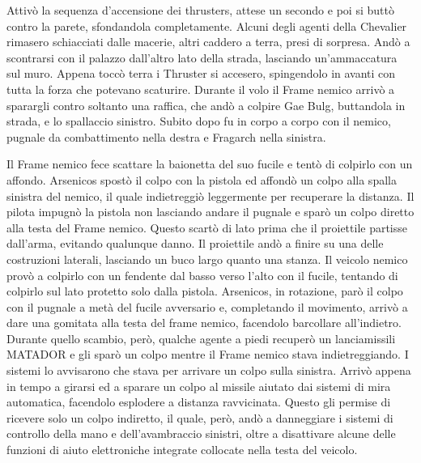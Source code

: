     Attivò la sequenza d'accensione dei thrusters, attese un secondo e poi si buttò contro la parete, sfondandola
    completamente. Alcuni degli agenti della Chevalier rimasero schiacciati dalle macerie, altri caddero a terra, presi
    di sorpresa. Andò a scontrarsi con il palazzo dall'altro lato della strada, lasciando un'ammaccatura sul muro.
    Appena toccò terra i Thruster si accesero, spingendolo in avanti con tutta la forza che potevano scaturire. Durante
    il volo il Frame nemico arrivò a sparargli contro soltanto una raffica, che andò a colpire Gae Bulg, buttandola in
    strada, e lo spallaccio sinistro. Subito dopo fu in corpo a corpo con il nemico, pugnale da combattimento nella
    destra e Fragarch nella sinistra.

    Il Frame nemico fece scattare la baionetta del suo fucile e tentò di colpirlo con un affondo. Arsenicos spostò il
    colpo con la pistola ed affondò un colpo alla spalla sinistra del nemico, il quale indietreggiò leggermente per
    recuperare la distanza. Il pilota impugnò la pistola non lasciando andare il pugnale e sparò un colpo diretto alla
    testa del Frame nemico. Questo scartò di lato prima che il proiettile partisse dall'arma, evitando qualunque danno.
    Il proiettile andò a finire su una delle costruzioni laterali, lasciando un buco largo quanto una stanza. Il veicolo
    nemico provò a colpirlo con un fendente dal basso verso l'alto con il fucile, tentando di colpirlo sul lato protetto
    solo dalla pistola. Arsenicos, in rotazione, parò il colpo con il pugnale a metà del fucile avversario e,
    completando il movimento, arrivò a dare una gomitata alla testa del frame nemico, facendolo barcollare all'indietro.
    Durante quello scambio, però, qualche agente a piedi recuperò un lanciamissili MATADOR e gli sparò un colpo mentre
    il Frame nemico stava indietreggiando. I sistemi lo avvisarono che stava per arrivare un colpo sulla sinistra.
    Arrivò appena in tempo a girarsi ed a sparare un colpo al missile aiutato dai sistemi di mira automatica, facendolo
    esplodere a distanza ravvicinata. Questo gli permise di ricevere solo un colpo indiretto, il quale, però, andò a
    danneggiare i sistemi di controllo della mano e dell'avambraccio sinistri, oltre a disattivare alcune delle funzioni
    di aiuto elettroniche integrate collocate nella testa del veicolo.

